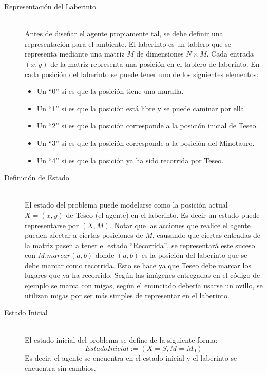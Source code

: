 \documentclass[letter, titlepage, 10pt]{article}
\begin{document}
\begin{description}
  \item[Representación del Laberinto] \hfill \\
  Antes de diseñar el agente propiamente tal, se debe definir una representación para el ambiente. El laberinto es un tablero que se representa mediante una matriz $M$ de dimensiones $N \times M$. Cada entrada $(x,y)$ de la matriz representa una posición en el tablero de laberinto. En cada posición del laberinto se puede tener uno de los siguientes elementos:
    \begin{itemize}
          \item Un ``0'' si es que la posición tiene una muralla.
          \item Un ``1'' si es que la posición está libre y se puede caminar por ella.
          \item Un ``2'' si es que la posición corresponde a la posición inicial de Teseo.
          \item Un ``3'' si es que la posición corresponde a la posición del Minotauro.
          \item Un ``4'' si es que la posición ya ha sido recorrida por Teseo.
    \end{itemize}
  \item[Definición de Estado] \hfill \\
  El estado del problema puede modelarse como la posición actual $X = (x,y)$ de Teseo (el agente) en el laberinto. Es decir un estado puede representarse por $(X, M)$. Notar que las acciones que realice el agente pueden afectar a ciertas posiciones de $M$, causando que ciertas entradas de la matriz pasen a tener el estado ``Recorrida'', se representará este suceso con $M.marcar(a,b)$ donde $(a,b)$ es la posición del laberinto que se debe marcar como recorrida. Esto se hace ya que Teseo debe marcar los lugares que ya ha recorrido. Según las imágenes entregadas en el código de ejemplo se marca con migas, según el enunciado debería usarse un ovillo, se utilizan migas por ser más simples de representar en el laberinto.
   
    \item[Estado Inicial] \hfill \\
    El estado inicial del problema se define de la siguiente forma:
  \begin{displaymath}
    EstadoInicial := \left(X = S, M = M_0\right)
  \end{displaymath}
  Es decir, el agente se encuentra en el estado inicial y el laberinto se encuentra sin cambios.
  

\end{description}
\end{document}
